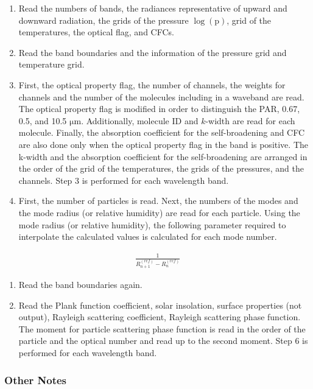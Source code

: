 \begin{enumerate}
\def\labelenumi{\arabic{enumi}.}
\item
  Read the numbers of bands, the radiances representative of upward and downward radiation, the grids of the pressure \(\log (\mathrm{p})\), grid of the temperatures, the optical flag, and CFCs.
\item
  Read the band boundaries and the information of the pressure grid and temperature grid.
\item
  First, the optical property flag, the number of channels, the weights for channels and the number of the molecules including in a waveband are read. The optical property flag is modified in order to
  distinguish the PAR, 0.67, 0.5, and 10.5 \(\mathrm{{\mu}m}\). Additionally, molecule ID and \(k\)-width are read for each molecule. Finally, the absorption coefficient for the self-broadening and
  CFC are also done only when the optical property flag in the band is positive. The k-width and the absorption coefficient for the self-broadening are arranged in the order of the grid of the
  temperatures, the grids of the pressures, and the channels. Step 3 is performed for each wavelength band.
\item
  First, the number of particles is read. Next, the numbers of the modes and the mode radius (or relative humidity) are read for each particle. Using the mode radius (or relative humidity), the
  following parameter required to interpolate the calculated values is calculated for each mode number.
\end{enumerate}

\begin{eqnarray}
   \frac{1}{R_{n+1}^{(r e f)}-R_{n}^{(r e f)}}
\end{eqnarray}

\begin{enumerate}
\def\labelenumi{\arabic{enumi}.}
\setcounter{enumi}{4}
\item
  Read the band boundaries again.
\item
  Read the Plank function coefficient, solar insolation, surface properties (not output), Rayleigh scattering coefficient, Rayleigh scattering phase function. The moment for particle scattering phase
  function is read in the order of the particle and the optical number and read up to the second moment. Step 6 is performed for each wavelength band.
\end{enumerate}

\hypertarget{other-notes}{%
\subsubsection{Other Notes}\label{other-notes}}


